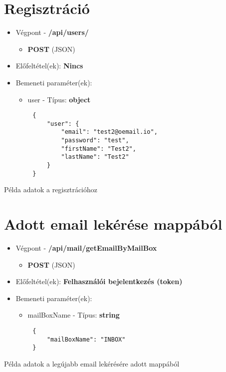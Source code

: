 \section{Regisztráció}
\begin{itemize}
    \item Végpont - \textbf{/api/users/}
    \begin{itemize}
        \item \textbf{POST} (JSON)
    \end{itemize}
    \item Előfeltétel(ek): \textbf{Nincs}
\end{itemize}
\begin{itemize}
    \item Bemeneti paraméter(ek):
    \begin{itemize}
        \item user - Típus: \textbf{object}
    \end{itemize}
\end{itemize}
\begin{listing}[H]
    \begin{verbatim}
        {
            "user": {
                "email": "test2@oemail.io",
                "password": "test",
                "firstName": "Test2",
                "lastName": "Test2"
            }
        }
    \end{verbatim}
    \caption{Példa adatok a regisztrációhoz}
    \label{code:json_register}
\end{listing}

\newpage
\section{Adott email lekérése mappából}
\begin{itemize}
    \item Végpont - \textbf{/api/mail/getEmailByMailBox}
    \begin{itemize}
        \item \textbf{POST} (JSON)
    \end{itemize}
    \item Előfeltétel(ek): \textbf{Felhasználói bejelentkezés (token)}
\end{itemize}
\begin{itemize}
    \item Bemeneti paraméter(ek):
    \begin{itemize}
        \item mailBoxName - Típus: \textbf{string}
    \end{itemize}
\end{itemize}
\begin{listing}[H]
    \begin{verbatim}
        {
            "mailBoxName": "INBOX"
        }
    \end{verbatim}
    \caption{Példa adatok a legújabb email lekérésére adott mappából}
    \label{code:json_mailbox_one}
\end{listing}

